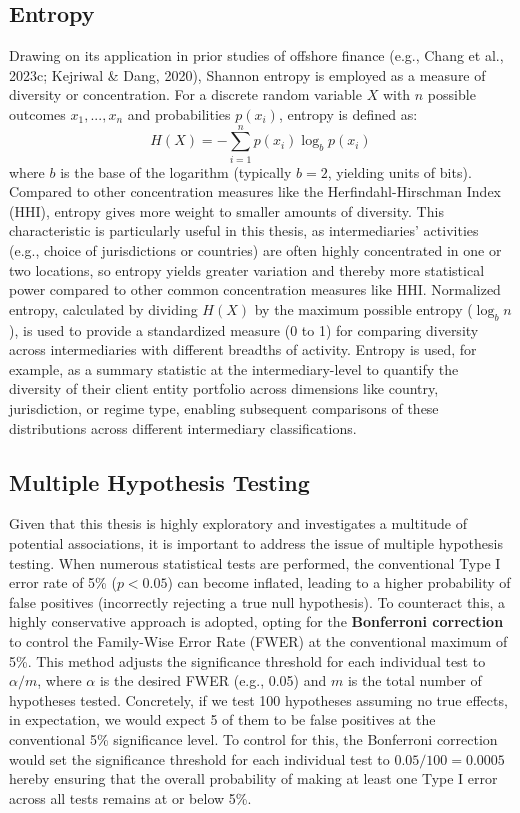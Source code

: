 \subsection{Entropy}
\label{subsec:entropy}
Drawing on its application in prior studies of offshore finance (e.g., Chang et al., 2023c; Kejriwal \& Dang, 2020), Shannon entropy is employed as a measure of diversity or concentration. For a discrete random variable $X$ with $n$ possible outcomes $x_1, ..., x_n$ and probabilities $p(x_i)$, entropy is defined as:
\begin{equation}
    H(X) = -\sum_{i=1}^{n} p(x_i) \log_b p(x_i)
\end{equation}
where $b$ is the base of the logarithm (typically $b=2$, yielding units of bits). Compared to other concentration measures like the Herfindahl-Hirschman Index (HHI), entropy gives more weight to smaller amounts of diversity. This characteristic is particularly useful in this thesis, as intermediaries' activities (e.g., choice of jurisdictions or countries) are often highly concentrated in one or two locations, so entropy yields greater variation and thereby more statistical power compared to other common concentration measures like HHI. Normalized entropy, calculated by dividing $H(X)$ by the maximum possible entropy ($\log_b n$), is used to provide a standardized measure (0 to 1) for comparing diversity across intermediaries with different breadths of activity. Entropy is used, for example, as a summary statistic at the intermediary-level to quantify the diversity of their client entity portfolio across dimensions like country, jurisdiction, or regime type, enabling subsequent comparisons of these distributions across different intermediary classifications.

\subsection{Multiple Hypothesis Testing}
\label{subsec:multiple_hypothesis_testing}
Given that this thesis is highly exploratory and investigates a multitude of potential associations, it is important to address the issue of multiple hypothesis testing. When numerous statistical tests are performed, the conventional Type I error rate of 5\% ($p < 0.05$) can become inflated, leading to a higher probability of false positives (incorrectly rejecting a true null hypothesis). To counteract this, a highly conservative approach is adopted, opting for the \textbf{Bonferroni correction} to control the Family-Wise Error Rate (FWER) at the conventional maximum of 5\%. This method adjusts the significance threshold for each individual test to $\alpha/m$, where $\alpha$ is the desired FWER (e.g., 0.05) and $m$ is the total number of hypotheses tested. Concretely, if we test 100 hypotheses assuming no true effects, in expectation, we would expect 5 of them to be false positives at the conventional 5\% significance level. To control for this, the Bonferroni correction would set the significance threshold for each individual test to $0.05/100 = 0.0005$ hereby ensuring that the overall probability of making at least one Type I error across all tests remains at or below 5\%.

